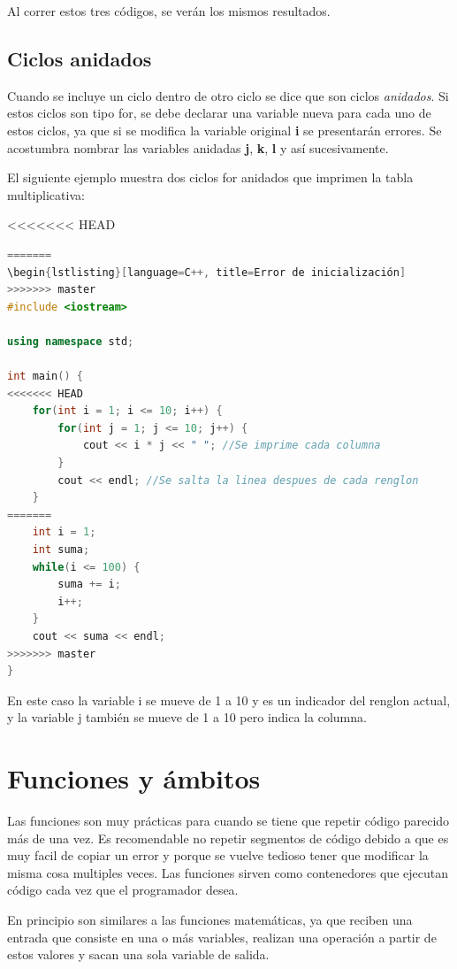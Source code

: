 \documentclass{article}
\begin{document}
Al correr estos tres códigos, se verán los mismos resultados.

\subsection{Ciclos anidados}

Cuando se incluye un ciclo dentro de otro ciclo se dice que son ciclos \textit{anidados}. Si estos ciclos son tipo for, se debe declarar una variable nueva para cada uno de estos ciclos, ya que si se modifica la variable original \textbf{i} se presentarán errores. Se acostumbra nombrar las variables anidadas \textbf{j}, \textbf{k}, \textbf{l} y así sucesivamente.

El siguiente ejemplo muestra dos ciclos for anidados que imprimen la tabla multiplicativa:

<<<<<<< HEAD
\begin{lstlisting}[language=C++, title=Tabla multiplicativa]
=======
\begin{lstlisting}[language=C++, title=Error de inicialización]
>>>>>>> master
#include <iostream>

using namespace std;

int main() {
<<<<<<< HEAD
	for(int i = 1; i <= 10; i++) {
		for(int j = 1; j <= 10; j++) {
			cout << i * j << " "; //Se imprime cada columna
		}
		cout << endl; //Se salta la linea despues de cada renglon
	}
=======
	int i = 1;
	int suma;
	while(i <= 100) {
		suma += i;
		i++;
	}
	cout << suma << endl;
>>>>>>> master
}
\end{lstlisting}

En este caso la variable i se mueve de 1 a 10 y es un indicador del renglon actual, y la variable j también se mueve de 1 a 10 pero indica la columna.

\section{Funciones y ámbitos}

Las funciones son muy prácticas para cuando se tiene que repetir código parecido más de una vez. Es recomendable no repetir segmentos de código debido a que es muy facil de copiar un error y porque se vuelve tedioso tener que modificar la misma cosa multiples veces. Las funciones sirven como contenedores que ejecutan código cada vez que el programador desea.

En principio son similares a las funciones matemáticas, ya que reciben una entrada que consiste en una o más variables, realizan una operación a partir de estos valores y sacan una sola variable de salida.
\end{document}
